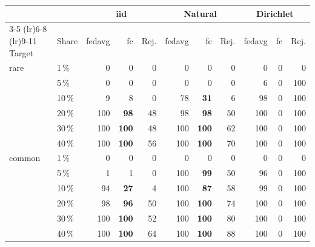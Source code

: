 \begin{tabular}{llrrrrrrrrr}
\toprule
 & & \multicolumn{3}{c}{\gls{iid}} & \multicolumn{3}{c}{Natural} & \multicolumn{3}{c}{Dirichlet} \\
\cmidrule(lr){3-5} \cmidrule(lr){6-8} \cmidrule(lr){9-11}
Target & Share & \gls{fedavg} & \gls{fc} & Rej. & \gls{fedavg} & \gls{fc} & Rej. & \gls{fedavg} & \gls{fc} & Rej. \\
\midrule
rare & 1\,\% & 0 & 0 & 0 & 0 & 0 & 0 & 0 & 0 & 0 \\
 & 5\,\% & 0 & 0 & 0 & 0 & 0 & 0 & 6 & 0 & 100 \\
 & 10\,\% & 9 & 8 & 0 & 78 & \textbf{31} & 6 & 98 & 0 & 100 \\
 & 20\,\% & 100 & \textbf{98} & 48 & 98 & \textbf{98} & 50 & 100 & 0 & 100 \\
 & 30\,\% & 100 & \textbf{100} & 48 & 100 & \textbf{100} & 62 & 100 & 0 & 100 \\
 & 40\,\% & 100 & \textbf{100} & 56 & 100 & \textbf{100} & 70 & 100 & 0 & 100 \\
\midrule
common & 1\,\% & 0 & 0 & 0 & 0 & 0 & 0 & 0 & 0 & 0 \\
 & 5\,\% & 1 & 1 & 0 & 100 & \textbf{99} & 50 & 96 & 0 & 100 \\
 & 10\,\% & 94 & \textbf{27} & 4 & 100 & \textbf{87} & 58 & 99 & 0 & 100 \\
 & 20\,\% & 98 & \textbf{96} & 50 & 100 & \textbf{100} & 74 & 100 & 0 & 100 \\
 & 30\,\% & 100 & \textbf{100} & 52 & 100 & \textbf{100} & 80 & 100 & 0 & 100 \\
 & 40\,\% & 100 & \textbf{100} & 64 & 100 & \textbf{100} & 88 & 100 & 0 & 100 \\
\bottomrule
\end{tabular}
